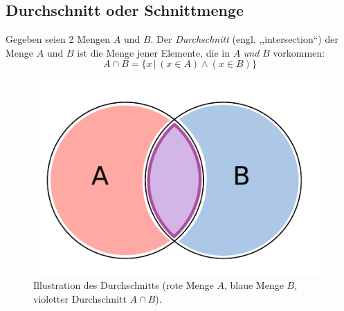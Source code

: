 \subsection{Durchschnitt oder Schnittmenge}
%
Gegeben seien 2 Mengen $A$ und $B$. Der \emph{Durchschnitt} (engl. ,,intersection``)
der Menge $A$ und $B$ ist die Menge jener Elemente, die in $A$ \emph{und}
$B$ vorkommen:
\[
    A \cap B = \{x \,|\, (x \in A) \land (x \in B)\}
\]
%
\begin{figure}[p]
 \begin{center}
  \includegraphics{img/intersection.pdf}
  \caption{Illustration des Durchschnitts (rote Menge $A$, blaue Menge $B$,
        violetter Durchschnitt $A \cap B$).}
  \label{fig:intersection}
 \end{center}
\end{figure}

